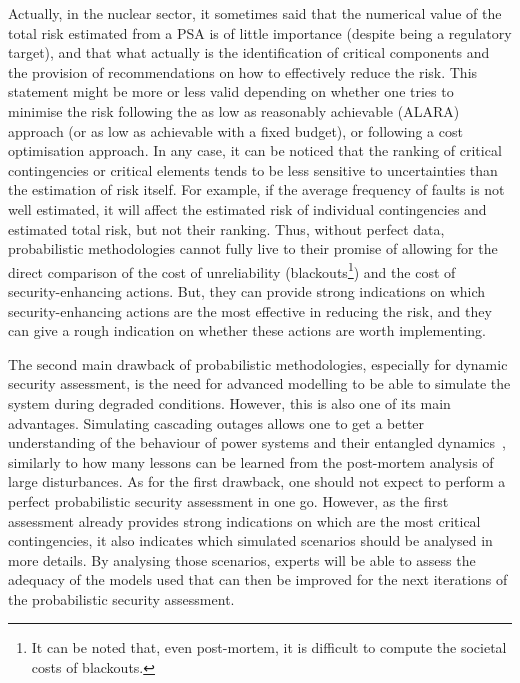 Actually, in the nuclear sector, it sometimes said that the numerical value of the total risk estimated from a PSA is of little importance (despite being a regulatory target), and that what actually is the identification of critical components and the provision of recommendations on how to effectively reduce the risk. This statement might be more or less valid depending on whether one tries to minimise the risk following the as low as reasonably achievable (ALARA) approach (or as low as achievable with a fixed budget), or following a cost optimisation approach. In any case, it can be noticed that the ranking of critical contingencies or critical elements tends to be less sensitive to uncertainties than the estimation of risk itself. For example, if the average frequency of faults is not well estimated, it will affect the estimated risk of individual contingencies and estimated total risk, but not their ranking. Thus, without perfect data, probabilistic methodologies cannot fully live to their promise of allowing for the direct comparison of the cost of unreliability (blackouts\footnote{It can be noted that, even post-mortem, it is difficult to compute the societal costs of blackouts.}) and the cost of security-enhancing actions. But, they can provide strong indications on which security-enhancing actions are the most effective in reducing the risk, and they can give a rough indication on whether these actions are worth implementing.

The second main drawback of probabilistic methodologies, especially for dynamic security assessment, is the need for advanced modelling to be able to simulate the system during degraded conditions. However, this is also one of its main advantages. Simulating cascading outages allows one to get a better understanding of the behaviour of power systems and their entangled dynamics~\cite{PEGASE_simulation}, similarly to how many lessons can be learned from the post-mortem analysis of large disturbances. As for the first drawback, one should not expect to perform a perfect probabilistic security assessment in one go. However, as the first assessment already provides strong indications on which are the most critical contingencies, it also indicates which simulated scenarios should be analysed in more details. By analysing those scenarios, experts will be able to assess the adequacy of the models used that can then be improved for the next iterations of the probabilistic security assessment.



